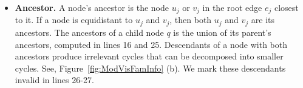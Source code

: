 \documentclass[fleqn,11pt]{article}
\begin{document}


\begin{itemize}
		\item \textbf{Ancestor.} 
		A node's ancestor is the node $u_j$ or $v_j$ in the root edge $e_j$ closest to it. 
		If a node is equidistant to $u_j$ and $v_j$, then both $u_j$ and $v_j$ are its ancestors.
		The ancestors of a child node $q$ is the union of its parent's ancestors, computed in lines 16 and 25.
		Descendants of a node with both ancestors produce irrelevant cycles that can be decomposed into smaller cycles. See, Figure~\ref{fig:ModVisFamInfo} (b). We mark these descendants invalid in lines 26-27.
		

\end{itemize}
\end{document}
